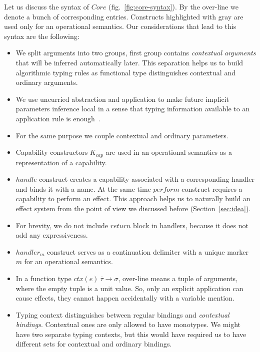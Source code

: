 \documentclass[acmsmall]{acmart}
\newcommand{\ctx}[1]{ctx(#1)~}
\begin{document}
Let us discuss the syntax of $Core$ (fig.\ \ref{fig:core-syntax}).
By the over-line we denote a bunch of corresponding entries.
Constructs highlighted with gray are used only for an operational semantics.
Our considerations that lead to this syntax are the following:
\begin{itemize}
    \item We split arguments into two groups, first group contains \textit{contextual arguments} that will be inferred automatically later.
    This separation helps us to build algorithmic typing rules as functional type distinguishes contextual and ordinary arguments.
    \item We use uncurried abstraction and application to make future implicit parameters inference local in a sense that typing information available to an application rule is enough~\cite{pierce2000local}.
    \item For the same purpose we couple contextual and ordinary parameters.
    \item Capability constructors $K_{cap}$ are used in an operational semantics as a representation of a capability. %
    \item $handle$ construct creates a capability associated with a corresponding handler and binds it with a name.
    At the same time $perform$ construct requires a capability to perform an effect.
    This approach helps us to naturally build an effect system from the point of view we discussed before (Section~\ref{sec:idea}).
    \item For brevity, we do not include $return$ block in handlers, because it does not add any expressiveness.
    \item $handler_m$ construct serves as a continuation delimiter with a unique marker $m$ for an operational semantics.
    \item In a function type $\ctx{e} \overline{\tau} \to \sigma$, over-line means a tuple of arguments, where the empty tuple is a unit value.
    So, only an explicit application can cause effects, they cannot happen accidentally with a variable mention.
    \item Typing context distinguishes between regular bindings and \textit{contextual bindings}.
    Contextual ones are only allowed to have monotypes.
    We might have two separate typing contexts, but this would have required us to have different sets for contextual and ordinary bindings.
\end{itemize}
\end{document}
